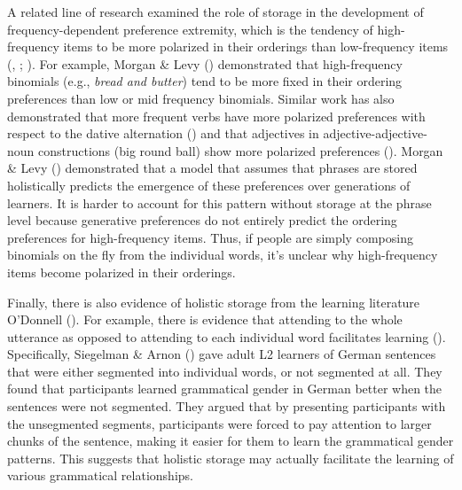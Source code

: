 \documentclass[
  12pt,
  letterpaper,
]{scrreport}
\begin{document}
A related line of research examined the role of storage in the
development of frequency-dependent preference extremity, which is the
tendency of high-frequency items to be more polarized in their orderings
than low-frequency items
(,
;
). For example, Morgan \& Levy
()
demonstrated that high-frequency binomials (e.g., \emph{bread and
butter}) tend to be more fixed in their ordering preferences than low or
mid frequency binomials. Similar work has also demonstrated that more
frequent verbs have more polarized preferences with respect to the
dative alternation
() and that adjectives in adjective-adjective-noun
constructions (big round ball) show more polarized preferences
(). Morgan \& Levy
()
demonstrated that a model that assumes that phrases are stored
holistically predicts the emergence of these preferences over
generations of learners. It is harder to account for this pattern
without storage at the phrase level because generative preferences do
not entirely predict the ordering preferences for high-frequency items.
Thus, if people are simply composing binomials on the fly from the
individual words, it's unclear why high-frequency items become polarized
in their orderings.

Finally, there is also evidence of holistic storage from the learning
literature O'Donnell
(). For
example, there is evidence that attending to the whole utterance as
opposed to attending to each individual word facilitates learning
(). Specifically, Siegelman \& Arnon
() gave adult L2
learners of German sentences that were either segmented into individual
words, or not segmented at all. They found that participants learned
grammatical gender in German better when the sentences were not
segmented. They argued that by presenting participants with the
unsegmented segments, participants were forced to pay attention to
larger chunks of the sentence, making it easier for them to learn the
grammatical gender patterns. This suggests that holistic storage may
actually facilitate the learning of various grammatical relationships.
\end{document}
